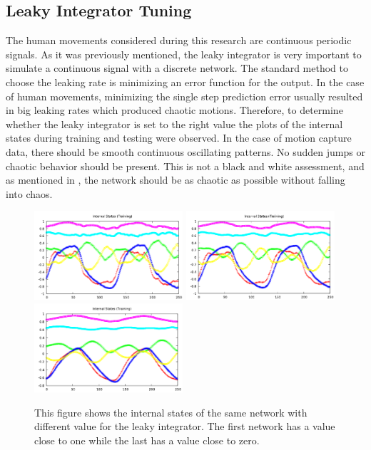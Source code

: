 \documentclass[letterpaper,9pt]{article}
\begin{document}
\pagebreak
\subsection{Leaky Integrator Tuning}

The human movements considered during this research are continuous periodic signals. As it was previously mentioned, the leaky integrator is very important to simulate a continuous signal with a discrete network. The standard method to choose the leaking rate is minimizing an error function for the output. In the case of human movements, minimizing the single step prediction error usually resulted in big leaking rates which produced chaotic motions. Therefore, to determine whether the leaky integrator is set to the right value the plots of the internal states during training and testing were observed. In the case of motion capture data, there should be smooth continuous oscillating patterns. No sudden jumps or chaotic behavior should be present. This is not a black and white assessment, and as mentioned in \cite{ESNVerstraeten}, the network should be as chaotic as possible without falling into chaos.

\begin{figure}[h!]
  \centering
  \includegraphics[height=125px]{Extra/sample_leaky_big.png}
  \includegraphics[height=125px]{Extra/sample_leaky_ok.png}
  \includegraphics[height=125px]{Extra/sample_leaky_low.png}
    \caption[Leaky Integrator Comparison]{This figure shows the internal states of the same network with different value for the leaky integrator. The first network has a value close to one while the last has a value close to zero.}
\end{figure}
\end{document}
